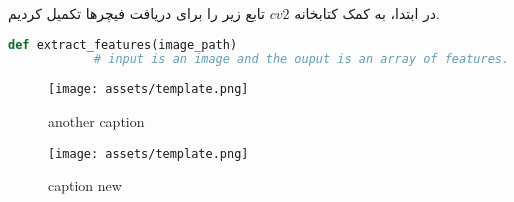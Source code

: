 \documentclass[a4paper,12pt]{article}
\begin{document}
	\pagebreak
	
	در ابتدا، به کمک کتابخانه 
	$cv2$
	تابع زیر را برای دریافت فیچرها تکمیل کردیم. 
	
	\begin{latin}
		\begin{lstlisting}[language=Python, caption={extract feature function}]
			def extract_features(image_path)
			# input is an image and the ouput is an array of features.
		\end{lstlisting}
	\end{latin}
	
	


	\begin{figure}[ht]
		\centering
		\begin{minipage}[t]{0.48\textwidth}
			\centering
			\texttt{[image: assets/template.png]}
			\caption{\textcolor{CustomAccent}{another caption}}
		\end{minipage}
		\hfill
		\begin{minipage}[t]{0.48\textwidth}
			\centering
			\texttt{[image: assets/template.png]}
			\caption{\textcolor{CustomAccent}{caption new}}
		\end{minipage}
		\vspace{1em}
	\end{figure}
\end{document}

